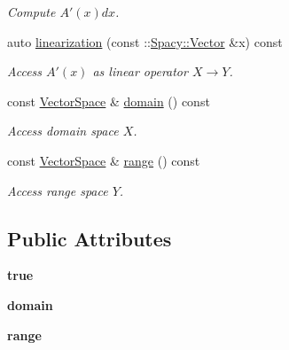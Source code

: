 \begin{DoxyCompactItemize}
\begin{DoxyCompactList}\small\item\em Compute $A'(x)dx$. \end{DoxyCompactList}\item 
auto \hyperlink{classSpacy_1_1FEniCS_1_1C1Operator_aab603c2b35f2b710b2e646cf3fb7ee9c}{linearization} (const \-::\hyperlink{classSpacy_1_1Vector}{Spacy\-::\-Vector} \&x) const 
\begin{DoxyCompactList}\small\item\em Access $A'(x)$ as linear operator $X\rightarrow Y$. \end{DoxyCompactList}\item 
\hypertarget{classSpacy_1_1OperatorBase_a2588f9b3e0188820c4c494e63293dc6f}{const \hyperlink{classSpacy_1_1VectorSpace}{Vector\-Space} \& \hyperlink{classSpacy_1_1OperatorBase_a2588f9b3e0188820c4c494e63293dc6f}{domain} () const }\label{classSpacy_1_1OperatorBase_a2588f9b3e0188820c4c494e63293dc6f}

\begin{DoxyCompactList}\small\item\em Access domain space $X$. \end{DoxyCompactList}\item 
\hypertarget{classSpacy_1_1OperatorBase_ab19d3b7a6f290b1079248f1e567e53d6}{const \hyperlink{classSpacy_1_1VectorSpace}{Vector\-Space} \& \hyperlink{classSpacy_1_1OperatorBase_ab19d3b7a6f290b1079248f1e567e53d6}{range} () const }\label{classSpacy_1_1OperatorBase_ab19d3b7a6f290b1079248f1e567e53d6}

\begin{DoxyCompactList}\small\item\em Access range space $Y$. \end{DoxyCompactList}\end{DoxyCompactItemize}
\subsection*{Public Attributes}
\begin{DoxyCompactItemize}
\item 
{\bfseries true}
\item 
\hypertarget{classSpacy_1_1FEniCS_1_1C1Operator_a519e7d3fc0292bb0a64860446adba0c2}{{\bfseries domain}}\label{classSpacy_1_1FEniCS_1_1C1Operator_a519e7d3fc0292bb0a64860446adba0c2}

\item 
{\bfseries range}
\end{DoxyCompactItemize}


